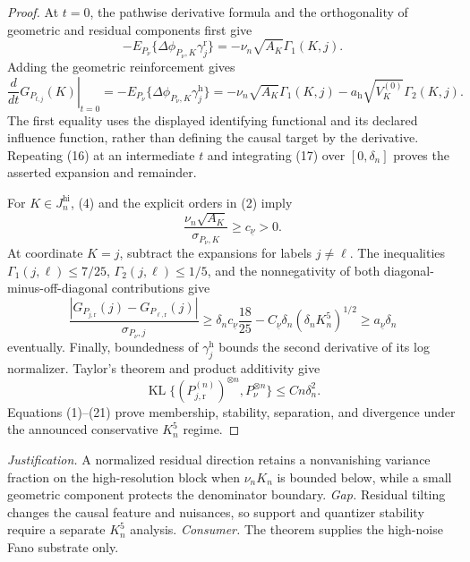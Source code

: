\documentclass{article}
\begin{document}
\begin{proof}
At \(t=0\), the pathwise derivative formula and the orthogonality of geometric and residual components first give
\[
 -E_{P_\nu}\{\Delta\phi_{P_\nu,K}\gamma_j^{\mathrm r}\}
 =-\nu_n\sqrt{A_K}\Gamma_1(K,j).                                        \tag{17}
\]
Adding the geometric reinforcement gives
\[
 \left.\frac{d}{dt}G_{P_{t,j}}(K)\right|_{t=0}
 =-E_{P_\nu}\{\Delta\phi_{P_\nu,K}\gamma_j^{\mathrm h}\}
 =-\nu_n\sqrt{A_K}\Gamma_1(K,j)
 -a_{\mathrm h}\sqrt{V_K^{(0)}}\Gamma_2(K,j).                           \tag{18}
\]
The first equality uses the displayed identifying functional and its declared influence function, rather than defining the causal target by the derivative.  Repeating (16) at an intermediate \(t\) and integrating (17) over \([0,\delta_n]\) proves the asserted expansion and remainder.

For \(K\in J_n^{\mathrm{hi}}\), (4) and the explicit orders in (2) imply
\[
 \frac{\nu_n\sqrt{A_K}}{\sigma_{P_\nu,K}}
 \geq c_{\underline\nu}>0.                                               \tag{19}
\]
At coordinate \(K=j\), subtract the expansions for labels \(j\ne\ell\).  The inequalities \(\Gamma_1(j,\ell)\leq7/25\), \(\Gamma_2(j,\ell)\leq1/5\), and the nonnegativity of both diagonal-minus-off-diagonal contributions give
\[
 \frac{|G_{P_{j,\mathrm r}}(j)-G_{P_{\ell,\mathrm r}}(j)|}{\sigma_{P_\nu,j}}
 \geq\delta_nc_{\underline\nu}\frac{18}{25}
 -C_{\underline\nu}\delta_n(\delta_nK_n^5)^{1/2}
 \geq a_{\underline\nu}\delta_n                                       \tag{20}
\]
eventually.  Finally, boundedness of \(\gamma_j^{\mathrm h}\) bounds the second derivative of its log normalizer.  Taylor's theorem and product additivity give
\[
 \operatorname{KL}\{(P_{j,\mathrm r}^{(n)})^{\otimes n},P_\nu^{\otimes n}\}
 \leq Cn\delta_n^2.                                                       \tag{21}
\]
Equations (1)--(21) prove membership, stability, separation, and divergence under the announced conservative \(K_n^5\) regime.
\end{proof}
\par\smallskip\noindent \textit{Justification.} A normalized residual direction retains a nonvanishing variance fraction on the high-resolution block when \(\nu_nK_n\) is bounded below, while a small geometric component protects the denominator boundary. \textit{Gap.} Residual tilting changes the causal feature and nuisances, so support and quantizer stability require a separate \(K_n^5\) analysis. \textit{Consumer.} The theorem supplies the high-noise Fano substrate only.
\end{document}
